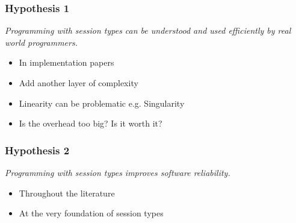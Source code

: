 %

\begin{frame}\frametitle{Hypothesis 1}
  \textit{Programming with session types can be understood and used efficiently by real world programmers.}
\begin{itemize}
\item In implementation papers
\item Add another layer of complexity
\item Linearity can be problematic e.g. Singularity\cite{singularity}
\item Is the overhead too big? Is it worth it?
\end{itemize}

\end{frame}

\begin{frame}\frametitle{Hypothesis 2}
  \textit{Programming with session types improves software reliability.}
\begin{itemize}
\item  Throughout the literature
\item At the very foundation of session types
\end{itemize}

\end{frame}
